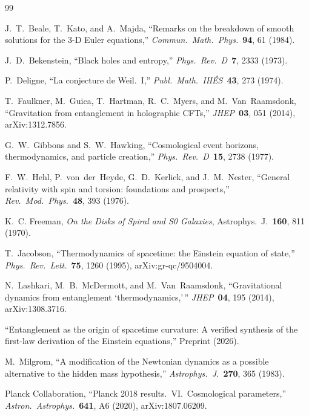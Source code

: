 \documentclass[12pt,letterpaper]{article}
\theoremstyle{plain}
\theoremstyle{definition}
\begin{document}
\begin{thebibliography}{99}

J.~T.\ Beale, T.\ Kato, and A.\ Majda,
``Remarks on the breakdown of smooth solutions for the 3-D Euler equations,''
\textit{Commun.\ Math.\ Phys.}\ \textbf{94}, 61 (1984).

J.~D.\ Bekenstein,
``Black holes and entropy,''
\textit{Phys.\ Rev.\ D}\ \textbf{7}, 2333 (1973).

P.\ Deligne,
``La conjecture de Weil.\ I,''
\textit{Publ.\ Math.\ IH\'{E}S}\ \textbf{43}, 273 (1974).

T.\ Faulkner, M.\ Guica, T.\ Hartman, R.~C.\ Myers, and M.\ Van~Raamsdonk,
``Gravitation from entanglement in holographic CFTs,''
\textit{JHEP}\ \textbf{03}, 051 (2014), arXiv:1312.7856.

G.~W.\ Gibbons and S.~W.\ Hawking,
``Cosmological event horizons, thermodynamics, and particle creation,''
\textit{Phys.\ Rev.\ D}\ \textbf{15}, 2738 (1977).

F.~W.\ Hehl, P.\ von~der~Heyde, G.~D.\ Kerlick, and J.~M.\ Nester,
``General relativity with spin and torsion: foundations and prospects,''
\textit{Rev.\ Mod.\ Phys.}\ \textbf{48}, 393 (1976).

K.~C. Freeman,
\emph{On the Disks of Spiral and S0 Galaxies},
Astrophys.\ J.\ \textbf{160}, 811 (1970).

T.\ Jacobson,
``Thermodynamics of spacetime: the Einstein equation of state,''
\textit{Phys.\ Rev.\ Lett.}\ \textbf{75}, 1260 (1995), arXiv:gr-qc/9504004.

N.\ Lashkari, M.~B.\ McDermott, and M.\ Van~Raamsdonk,
``Gravitational dynamics from entanglement `thermodynamics,'\,''
\textit{JHEP}\ \textbf{04}, 195 (2014), arXiv:1308.3716.

``Entanglement as the origin of spacetime curvature: A verified synthesis of the first-law derivation of the Einstein equations,''
Preprint (2026).

M.\ Milgrom,
``A modification of the Newtonian dynamics as a possible alternative to the hidden mass hypothesis,''
\textit{Astrophys.\ J.}\ \textbf{270}, 365 (1983).

Planck Collaboration,
``Planck 2018 results.\ VI.\ Cosmological parameters,''
\textit{Astron.\ Astrophys.}\ \textbf{641}, A6 (2020), arXiv:1807.06209.


\end{thebibliography}
\end{document}
